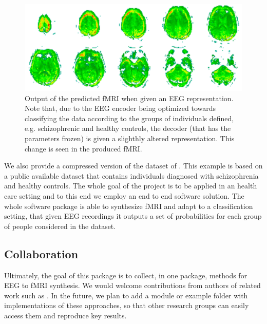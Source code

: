 \begin{figure}[t]
    \centering
    \includegraphics[width=\textwidth]{figures/discriminative.png}
    \caption{Output of the predicted fMRI when given an EEG representation. Note that, due to the EEG encoder being optimized towards classifying the data according to the groups of individuals defined, e.g. schizophrenic and healthy controls, the decoder (that has the parameters frozen) is given a slighthly altered representation. This change is seen in the produced fMRI.}
    \label{fig:discriminative}
\end{figure}
We also provide a compressed version of the dataset of \cite{dataset2022fribourg}. This example is based on a public available dataset that contains individuals diagnosed with schizophrenia and healthy controls. The whole goal of the project is to be applied in an health care setting and to this end we employ an end to end software solution. The whole software package is able to synthesize fMRI and adapt to a classification setting, that given EEG recordings it outputs a set of probabilities for each group of people considered in the dataset.



\subsection{Collaboration}\label{section:collabs}

Ultimately, the goal of this package is to collect, in one package, methods for EEG to fMRI synthesis. We would welcome contributions from authors of related work such as \cite{liu2019convolutional}. In the future, we plan to add a module or example folder with implementations of these approaches, so that other research groups can easily access them and reproduce key results. 

